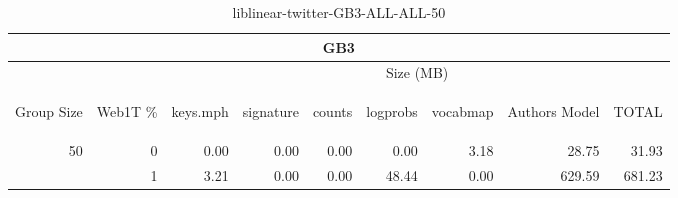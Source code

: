 \begin{center}
\begin{table}[htbp] 
 \begin{center}
\begin{tabular}{ | r | r | r | r | r | r | r | r | r |}
\hline
\multicolumn{9}{|c|}{GB3}\\
\hline
 & & \multicolumn{7}{|c|}{Size (MB)}\\ \cline{3-9}
\begin{sideways}Group Size\end{sideways} & \begin{sideways}Web1T \% \end{sideways} & \begin{sideways}keys.mph\end{sideways} & \begin{sideways}signature\end{sideways} & \begin{sideways}counts\end{sideways} & \begin{sideways}logprobs\end{sideways} & \begin{sideways}vocabmap\end{sideways} & \begin{sideways}Authors Model \end{sideways} & \begin{sideways}TOTAL\end{sideways}\\
\hline
\multirow{1}{*}{50}
 & 0 & 0.00 & 0.00 & 0.00 & 0.00 & 3.18 & 28.75 & 31.93\\ \cline{2-9}
 & 1 & 3.21 & 0.00 & 0.00 & 48.44 & 0.00 & 629.59 & 681.23\\ \cline{2-9}
\hline
\end{tabular}
\caption{liblinear-twitter-GB3-ALL-ALL-50}
\label{table:liblinear-twitter-GB3-ALL-ALL-50}
\end{center}
 \end{table}
\end{center}


